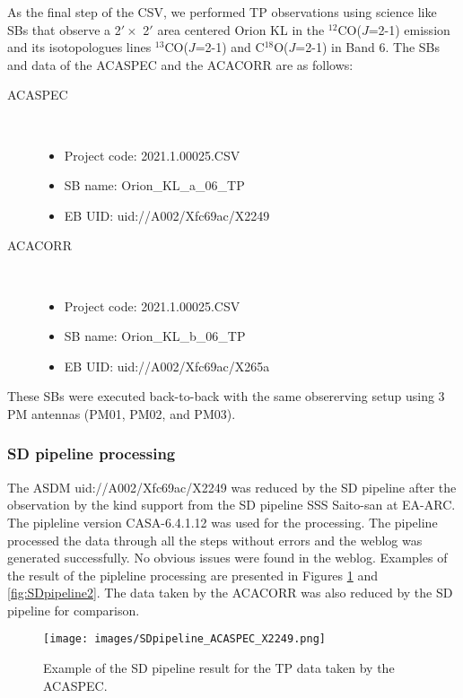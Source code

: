 As the final step of the CSV, we performed TP observations  using science like SBs that observe a 2$' \times$ 2$'$ area centered Orion KL in the $^{12}$CO($J$=2-1) emission and its isotopologues lines $^{13}$CO($J$=2-1) and C$^{18}$O($J$=2-1) in Band 6. The SBs and data of the ACASPEC and the ACACORR are as follows:
\begin{description}
\item[ACASPEC]\ 
\begin{itemize}
    \item Project code: 2021.1.00025.CSV
    \item SB name: Orion\_KL\_a\_06\_TP
    \item EB UID: uid://A002/Xfc69ac/X2249
\end{itemize}
\item[ACACORR]\ 
\begin{itemize}
    \item Project code: 2021.1.00025.CSV
    \item SB name: Orion\_KL\_b\_06\_TP
    \item EB UID: uid://A002/Xfc69ac/X265a
\end{itemize}
\end{description}
These SBs were executed back-to-back with the same obsererving setup using 3 PM antennas (PM01, PM02, and PM03).

\subsubsection{SD pipeline processing}
The ASDM uid://A002/Xfc69ac/X2249 was reduced by the SD pipeline after the observation by the kind support from the SD pipeline SSS Saito-san at EA-ARC. The pipleline version CASA-6.4.1.12 was used for the processing. The pipeline processed the data through all the steps without errors and the weblog was generated successfully. No obvious issues were found in the weblog. Examples of the result of the pipleline processing are presented in Figures \ref{fig:SDpipeline1} and  \ref{fig:SDpipeline2}. The data taken by the ACACORR was also reduced by the SD pipeline for comparison. 

\begin{figure}[htbp]
     \centering
     \texttt{[image: images/SDpipeline\_ACASPEC\_X2249.png]}
     \caption{Example of the SD pipeline result for the TP data taken by the ACASPEC.}
     \label{fig:SDpipeline1}
\end{figure}

